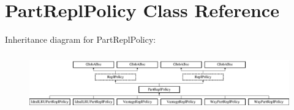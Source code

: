 \hypertarget{classPartReplPolicy}{\section{Part\-Repl\-Policy Class Reference}
\label{classPartReplPolicy}
}
Inheritance diagram for Part\-Repl\-Policy\-:\begin{figure}[H]
\begin{center}
\leavevmode
\includegraphics[height=2.440087cm]{classPartReplPolicy}
\end{center}
\end{figure}

